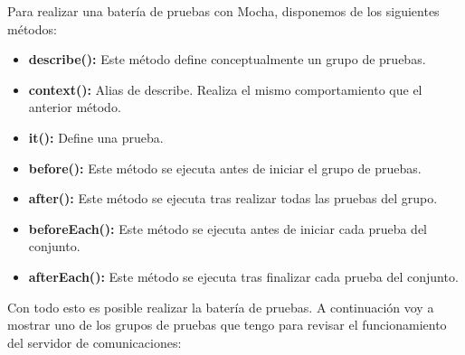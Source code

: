 \documentclass[spanish,12pt, a4paper, twoside]{paper}
\begin{document}
Para realizar una batería de pruebas con Mocha, disponemos de los siguientes métodos:
\begin{itemize}
\item\textbf{describe():} Este método define conceptualmente un grupo de pruebas.
\item\textbf{context():} Alias de describe. Realiza el mismo comportamiento que el anterior método.
\item\textbf{it():} Define una prueba.
\item\textbf{before():} Este método se ejecuta antes de iniciar el grupo de pruebas.
\item\textbf{after():} Este método se ejecuta tras realizar todas las pruebas del grupo.
\item\textbf{beforeEach():} Este método se ejecuta antes de iniciar cada prueba del conjunto.
\item\textbf{afterEach():} Este método se ejecuta tras finalizar cada prueba del conjunto.
\end{itemize}

Con todo esto es posible realizar la batería de pruebas. A continuación voy a mostrar uno de los grupos de pruebas que tengo para revisar el funcionamiento del servidor de comunicaciones:
\end{document}
